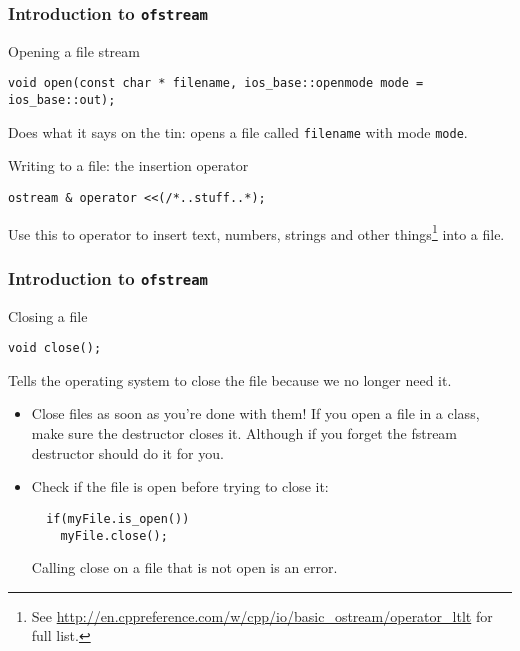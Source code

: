 \documentclass{beamer}
\begin{document}
\begin{frame}[fragile]
  \frametitle{Introduction to \texttt{ofstream}}
  \begin{block}{Opening a file stream}
  	\begin{lstlisting}[aboveskip=0pt]
  void open(const char * filename, ios_base::openmode mode = ios_base::out);
  	\end{lstlisting}
		Does what it says on the tin: opens a file called \texttt{filename} with mode \texttt{mode}.
  
  \end{block}
  \pause
  \begin{block}{Writing to a file: the insertion operator}
  \begin{lstlisting}[aboveskip=0pt]
  ostream & operator <<(/*..stuff..*);
  \end{lstlisting}
  Use this to operator to insert text, numbers, strings and other things\footnote{See \url{http://en.cppreference.com/w/cpp/io/basic_ostream/operator_ltlt} for full list.} into a file.
  \end{block}
  
\end{frame}

\begin{frame}[fragile]
  \frametitle{Introduction to \texttt{ofstream}}
  
  \begin{block}{Closing a file}
  \begin{lstlisting}[aboveskip=0pt]
  void close();
  \end{lstlisting}
  Tells the operating system to close the file because we no longer need it.
  \end{block}
  \pause
  \begin{doblocke}
    \begin{itemize}
      \item{Close files as soon as you're done with them!  If you open a file in a class, make sure the destructor closes it. Although if you forget the fstream destructor should do it for you.}
      \pause
      \item{Check if the file is open before trying to close it:
      \begin{lstlisting}
  if(myFile.is_open())
    myFile.close();
      \end{lstlisting}
      Calling close on a file that is not open is an error.}
    \end{itemize}
  \end{doblocke}
  
\end{frame}
\end{document}
